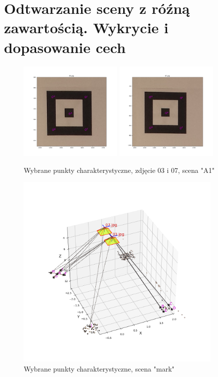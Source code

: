 \section{Odtwarzanie sceny z róźną zawartością. Wykrycie i dopasowanie cech}
\begin{figure}[h]
   \centering
   \includegraphics[width=5cm]{feature_mark/03.png}
   \includegraphics[width=5cm]{feature_mark/07.png}
   \caption{Wybrane punkty charakterystyczne, zdjęcie 03 i 07, scena "A1"}
   \label {fig:feature_mark_03_07}
\end{figure}

\begin{figure}[h]
   \centering
   \includegraphics[width=10cm]{feature_mark/scene.png}
   \caption{Wybrane punkty charakterystyczne, scena "mark"}
   \label {fig:feature_mark_plot}
\end{figure}

